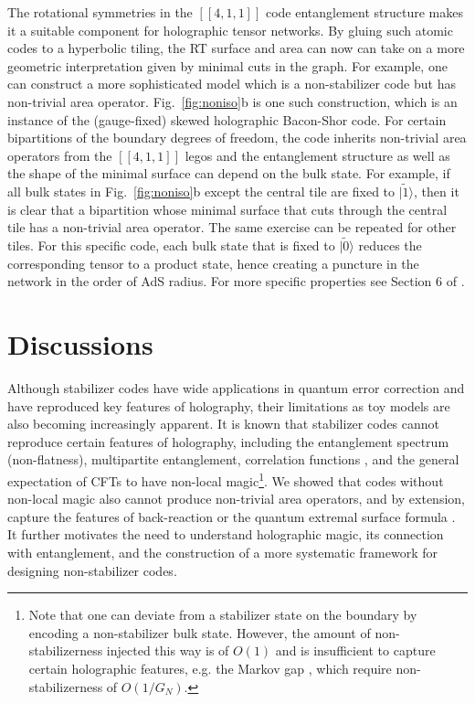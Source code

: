 \documentclass[a4paper,11pt]{article}
\theoremstyle{definition}
\numberwithin{equation}{section}
\begin{document}
The rotational symmetries in the $[[4,1,1]]$ code entanglement structure makes it a suitable component for holographic tensor networks. By gluing such atomic codes to a hyperbolic tiling\cite{QL}, the RT surface and area can now can take on a more geometric interpretation given by minimal cuts in the graph. For example, one can construct a more sophisticated model which is a non-stabilizer code but has non-trivial area operator. Fig.~\ref{fig:noniso}b is one such construction, which is an instance of the (gauge-fixed) skewed holographic Bacon-Shor code. For certain bipartitions of the boundary degrees of freedom, the code inherits non-trivial area operators from the $[[4,1,1]]$ legos and the entanglement structure as well as the shape of the minimal surface can depend on the bulk state. For example, if all bulk states in Fig.~\ref{fig:noniso}b except the central tile are fixed to $|\tilde{1}\rangle$, then it is clear that a bipartition whose minimal surface that cuts through the central tile has a non-trivial area operator. The same exercise can be repeated for other tiles. For this specific code, each bulk state that is fixed to $|\tilde{0}\rangle$ reduces the corresponding tensor to a product state, hence creating a puncture in the network in the order of AdS radius. For more specific properties see Section 6 of \cite{Cao:2020ksw}. 



\section{Discussions}
Although stabilizer codes have wide applications in quantum error correction and have reproduced key features of holography, their limitations as toy models are also becoming increasingly apparent. It is known that stabilizer codes cannot reproduce certain features of holography, including the entanglement spectrum (non-flatness), multipartite entanglement\cite{tripartite,markovgap}, correlation functions \cite{Pastawski:2015qua,Jahn:2019nmz,Jahn2022tensornetworkmodels}, and the general expectation of CFTs to have non-local magic\footnote{Note that one can deviate from a stabilizer state on the boundary by encoding a non-stabilizer bulk state. However, the amount of non-stabilizerness injected this way is of $O(1)$ and is insufficient to capture certain holographic features, e.g. the Markov gap \cite{markovgap}, which require non-stabilizerness of $O(1/G_N)$. }. We showed that codes without non-local magic also cannot produce non-trivial area operators, and by extension, capture the features of back-reaction or the quantum extremal surface formula \cite{Engelhardt:2014gca}. 
It further motivates the need to understand holographic magic\cite{White:2020zoz,Goto}, its connection with entanglement, and the construction of a more systematic framework for designing non-stabilizer codes.
\end{document}
